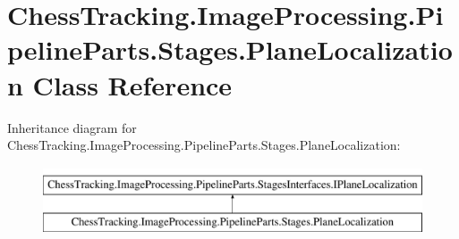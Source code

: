 \hypertarget{class_chess_tracking_1_1_image_processing_1_1_pipeline_parts_1_1_stages_1_1_plane_localization}{}\section{Chess\+Tracking.\+Image\+Processing.\+Pipeline\+Parts.\+Stages.\+Plane\+Localization Class Reference}
\label{class_chess_tracking_1_1_image_processing_1_1_pipeline_parts_1_1_stages_1_1_plane_localization}
Inheritance diagram for Chess\+Tracking.\+Image\+Processing.\+Pipeline\+Parts.\+Stages.\+Plane\+Localization\+:\begin{figure}[H]
\begin{center}
\leavevmode
\includegraphics[height=2.000000cm]{class_chess_tracking_1_1_image_processing_1_1_pipeline_parts_1_1_stages_1_1_plane_localization}
\end{center}
\end{figure}
